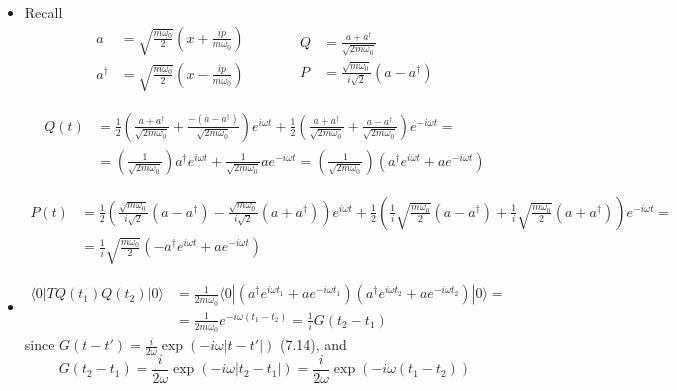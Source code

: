 \documentclass[twoside]{amsart}
\begin{document}
\begin{itemize}
\[
\boxed{ P(t) = \frac{1}{2} \left( P - \frac{ m \omega Q}{i} \right) e^{i \omega t} + \frac{1}{2} \left( P + \frac{ m \omega Q}{i} \right) e^{-i \omega t} }
\]
\item[(b)] Recall
\[
\begin{aligned} a & = \sqrt{ \frac{ m \omega_0 }{2} } \left( x + \frac{ i p }{m\omega_0} \right) \\ 
  a^{\dag} & = \sqrt{ \frac{ m \omega_0}{2}} \left( x - \frac{ i p }{m \omega_0} \right) \end{aligned} \quad \quad \quad \, \begin{aligned} Q & = \frac{ a + a^{\dag}}{ \sqrt{ 2m\omega_0} } \\ P & = \frac{ \sqrt{ m \omega_0}}{ i \sqrt{2}} (a- a^{\dag}) \end{aligned}
\]

\[
\begin{aligned}
  Q(t) & = \frac{1}{2} \left( \frac{ a + a^{\dag}}{ \sqrt{ 2 m \omega_0 } } + \frac{ - (a-a^{\dag} )}{ \sqrt{ 2 m \omega_0} } \right) e^{i \omega t} + \frac{1}{2} \left( \frac{ a + a^{\dag}}{ \sqrt{ 2 m \omega_0} } + \frac{ a- a^{ \dag}}{ \sqrt{ 2 m \omega_0} } \right) e^{-i \omega t} = \\
  & = \left( \frac{ 1}{ \sqrt{ 2 m \omega_0 } } \right) a^{\dag} e^{i \omega t} + \frac{1}{ \sqrt{ 2 m \omega_0} } ae^{- i \omega t} = \left( \frac{ 1}{ \sqrt{ 2 m \omega_0} } \right) (a^{\dag} e^{i \omega t} + ae^{-i\omega t} )
\end{aligned}
\]

\[
\begin{aligned}
  P(t) & = \frac{1}{2} \left( \frac{ \sqrt{ m \omega_0}}{ i \sqrt{2}} (a- a^{\dag}) - \frac{ \sqrt{ m \omega_0}}{ i \sqrt{2}} (a+ a^{\dag}) \right) e^{i \omega t} + \frac{1}{2} \left( \frac{1}{i} \sqrt{ \frac{m \omega_0}{2} } (a-a^{\dag} ) + \frac{1}{i} \sqrt{ \frac{ m\omega_0 }{2} } (a+a^{\dag}) \right) e^{-i \omega t} = \\
  & = \frac{1}{i} \sqrt{ \frac{ m \omega_0}{2} } \left( -a^{\dag} e^{i \omega t} +  ae^{-i\omega t} \right)
\end{aligned}
\]

\item[(c)] \[
\begin{aligned}
  \langle 0 | TQ(t_1) Q(t_2) |0 \rangle & = \frac{1}{2m \omega_0} \langle 0 | (a^{\dag} e^{i \omega t_1} + ae^{-i \omega t_1} )(a^{\dag} e^{i \omega t_2} + ae^{-i \omega t_2} ) | 0 \rangle = \\
  & = \frac{1}{2 m \omega_0} e^{- i \omega (t_1 - t_2) }  = \frac{1}{i} G(t_2- t_1)
\end{aligned}
\]
since $G(t-t') = \frac{i}{2\omega} \exp{ ( - i \omega | t-t'| ) }$  (7.14), and 
\[
G(t_2 - t_1) = \frac{i}{2 \omega} \exp{ ( -i \omega |t_2 -t_1| ) } = \frac{i}{2\omega} \exp{ (-i \omega (t_1-t_2) )}
\]


\end{itemize}
\end{document}
